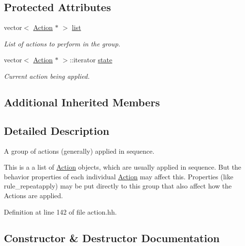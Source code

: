 \subsection*{Protected Attributes}
\begin{DoxyCompactItemize}
\item 
vector$<$ \mbox{\hyperlink{class_action}{Action}} $\ast$ $>$ \mbox{\hyperlink{class_action_group_a2490d195adbf5542c17f3a751afc31c1}{list}}
\begin{DoxyCompactList}\small\item\em List of actions to perform in the group. \end{DoxyCompactList}\item 
vector$<$ \mbox{\hyperlink{class_action}{Action}} $\ast$ $>$\+::iterator \mbox{\hyperlink{class_action_group_a7989aa415058903bd2bd3f06227e9ea1}{state}}
\begin{DoxyCompactList}\small\item\em Current action being applied. \end{DoxyCompactList}\end{DoxyCompactItemize}
\subsection*{Additional Inherited Members}


\subsection{Detailed Description}
A group of actions (generally) applied in sequence. 

This is a a list of \mbox{\hyperlink{class_action}{Action}} objects, which are usually applied in sequence. But the behavior properties of each individual \mbox{\hyperlink{class_action}{Action}} may affect this. Properties (like rule\+\_\+repeatapply) may be put directly to this group that also affect how the Actions are applied. 

Definition at line 142 of file action.\+hh.



\subsection{Constructor \& Destructor Documentation}
\mbox{\label{class_action_group_a36259f8d2aef3e00f7fb8688331653f6}} 
